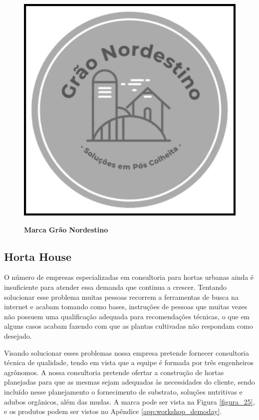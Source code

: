 \begin{figure}[H]
\centering
\caption{\textbf{Marca Grão Nordestino}}
\includegraphics[scale=0.07]{Imagens/graonordestino.png}
\label{figura_21}
\end{figure}

\subsection{Horta House}


O número de empresas especializadas em consultoria para hortas urbanas ainda é insuficiente para atender essa demanda que continua a crescer. Tentando solucionar esse problema muitas pessoas recorrem a ferramentas de busca na internet e acabam tomando como bases, instruções de pessoas que muitas vezes não possuem uma qualificação adequada para recomendações técnicas, o que em alguns casos acabam fazendo com que as plantas cultivadas não respondam como desejado.


Visando solucionar esses problemas nossa empresa pretende fornecer consultoria técnica de qualidade, tendo em vista que a equipe é formada por três engenheiros agrônomos. A nossa consultoria pretende ofertar a construção de hortas planejadas para que as mesmas sejam adequadas às necessidades do cliente, sendo incluído nesse planejamento o fornecimento de substrato, soluções nutritivas e adubos orgânicos, além das mudas. A marca pode ser vista na Figura \ref{figura_25}, e os produtos podem ser vistos no Apêndice \ref{app:workshop_demoday}.


